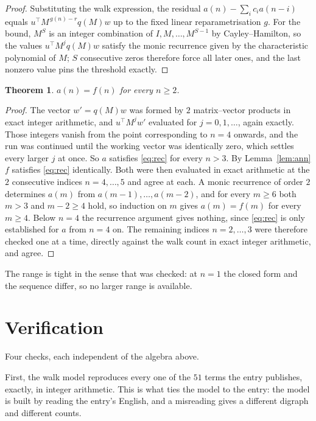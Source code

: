 \documentclass[11pt,a4paper]{article}
\theoremstyle{plain}
\newtheorem{theorem}{Theorem}
\theoremstyle{definition}
\begin{document}
\begin{proof}
Substituting the walk expression, the residual $a(n)-\sum_ic_ia(n-i)$ equals
$u^{\!\top}M^{\,g(n)-r}q(M)w$ up to the fixed linear reparametrisation $g$. For the bound,
$M^{S}$ is an integer combination of $I,M,\dots,M^{S-1}$ by Cayley--Hamilton, so the values
$u^{\!\top}M^{j}q(M)w$ satisfy the monic recurrence given by the characteristic polynomial of
$M$; $S$ consecutive zeros therefore force all later ones, and the last nonzero value pins the
threshold exactly.
\end{proof}

\begin{theorem}
$a(n)=f(n)$ for every $n\ge2$.
\end{theorem}

\begin{proof}
The vector $w'=q(M)w$ was formed by $2$ matrix--vector products in exact integer
arithmetic, and $u^{\!\top}M^{j}w'$ evaluated for $j=0,1,\dots$, again exactly. Those integers
vanish from the point corresponding to $n=4$ onwards, and the run was continued until the
working vector was identically zero, which settles every larger $j$ at once. So $a$ satisfies
\eqref{eq:rec} for every $n>3$. By Lemma~\ref{lem:ann} $f$ satisfies \eqref{eq:rec}
identically. Both were then evaluated in exact arithmetic at the $2$ consecutive indices
$n=4,\dots,5$ and agree at each. A monic recurrence of order $2$
determines $a(m)$ from $a(m-1),\dots,a(m-2)$, and for every $m\ge6$ both
$m>3$ and $m-2\ge4$ hold, so induction on $m$ gives $a(m)=f(m)$ for every
$m\ge4$.
Below $n=4$ the recurrence argument gives nothing, since \eqref{eq:rec} is only
established for $a$ from $n=4$ on. The remaining indices $n=2,\dots,3$ were
therefore checked one at a time, directly against the walk count in exact integer arithmetic,
and agree.
\end{proof}

The range is tight in the sense that was checked: at $n=1$ the closed form and the sequence differ, so no larger range is available.

\section{Verification}

Four checks, each independent of the algebra above.

First, the walk model reproduces every one of the $51$ terms the entry publishes,
exactly, in integer arithmetic. This is what ties the model to the entry: the model is built
by reading the entry's English, and a misreading gives a different digraph and different
counts.
\end{document}
